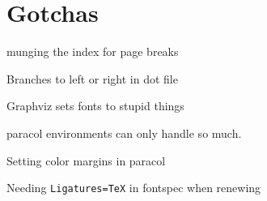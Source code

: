 \chapter*{Gotchas}

\label{gotchas}

\label{indexmunge}munging the index for page breaks

\label{branchdir}Branches to left or right in dot file

\label{svgfont}Graphviz sets fonts to stupid things

\label{toofull} paracol environments can only handle so much.

\label{color-margins} Setting color margins in paracol

\label{ligatures} Needing \texttt{Ligatures=TeX} in fontspec when renewing
